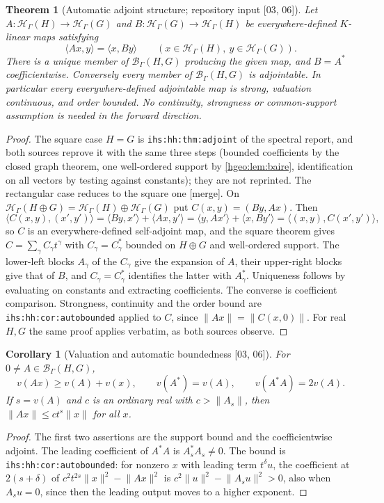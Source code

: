 \documentclass[11pt,letterpaper]{article}
\numberwithin{equation}{section}
\newtheorem{theorem}{Theorem}[section]
\newtheorem{corollary}[corollary]{Corollary}
\theoremstyle{definition}
\theoremstyle{remark}
\newcommand{\K}{K}
\newcommand{\HH}[1]{\mathscr H_\Gamma(#1)}
\newcommand{\BB}[2]{\mathscr B_\Gamma(#1,#2)}
\newcommand{\ip}[2]{\langle #1,#2\rangle}
\newcommand{\norm}[1]{\lVert #1\rVert}
\newcommand{\src}[1]{\textup{\textsf{\small[#1]}}}
\newcommand{\mergetag}{\textup{\textsf{\small[merge]}}}
\newcommand{\replabel}[1]{\nolinkurl{#1}}
\begin{document}
\begin{theorem}[Automatic adjoint structure; repository input
\src{03, 06}]\label{hgeo:thm:adjoint}
Let $A:\HH{H}\to\HH{G}$ and $B:\HH{G}\to\HH{H}$ be everywhere-defined
$\K$-linear maps satisfying
\[
 \ip{Ax}{y}=\ip{x}{By}\qquad(x\in\HH{H},\ y\in\HH{G}).
\]
There is a unique member of $\BB{H}{G}$ producing the given map, and
$B=A^*$ coefficientwise. Conversely every member of $\BB{H}{G}$ is
adjointable. In particular every everywhere-defined adjointable map is
strong, valuation continuous, and order bounded. No continuity, strongness
or common-support assumption is needed in the forward direction.
\end{theorem}
\begin{proof}
The square case $H=G$ is \replabel{ihs:hh:thm:adjoint} of the spectral
report, and both sources reprove it with the same three steps (bounded
coefficients by the closed graph theorem, one well-ordered support by
\cref{hgeo:lem:baire}, identification on all vectors by testing against
constants); they are not reprinted. The rectangular case reduces to the
square one \mergetag. On $\HH{H\oplus G}=\HH{H}\oplus\HH{G}$ put
$C(x,y)=(By,Ax)$. Then
\[
 \ip{C(x,y)}{(x',y')}=\ip{By}{x'}+\ip{Ax}{y'}
 =\ip{y}{Ax'}+\ip{x}{By'}=\ip{(x,y)}{C(x',y')},
\]
so $C$ is an everywhere-defined self-adjoint map, and the square theorem
gives $C=\sum_\gamma C_\gamma t^\gamma$ with $C_\gamma=C_\gamma^*$ bounded on
$H\oplus G$ and well-ordered support. The lower-left blocks $A_\gamma$ of the
$C_\gamma$ give the expansion of $A$, their upper-right blocks give that of
$B$, and $C_\gamma=C_\gamma^*$ identifies the latter with $A_\gamma^*$.
Uniqueness follows by evaluating on constants and extracting coefficients.
The converse is coefficient comparison. Strongness, continuity and the order
bound are \replabel{ihs:hh:cor:autobounded} applied to $C$, since
$\norm{Ax}=\norm{C(x,0)}$. For real $H,G$ the same proof applies verbatim, as
both sources observe.
\end{proof}

\begin{corollary}[Valuation and automatic boundedness
\src{03, 06}]\label{hgeo:cor:vop}
For $0\ne A\in\BB{H}{G}$,
\[
 v(Ax)\ge v(A)+v(x),\qquad
 v(A^*)=v(A),\qquad
 v(A^*A)=2v(A).
\]
If $s=v(A)$ and $c$ is an ordinary real with $c>\norm{A_s}$, then
$\norm{Ax}\le ct^s\norm{x}$ for all $x$.
\end{corollary}
\begin{proof}
The first two assertions are the support bound and the coefficientwise
adjoint. The leading coefficient of $A^*A$ is $A_s^*A_s\ne0$. The bound is
\replabel{ihs:hh:cor:autobounded}: for nonzero $x$ with leading term
$t^\delta u$, the coefficient at $2(s+\delta)$ of
$c^2t^{2s}\norm{x}^2-\norm{Ax}^2$ is $c^2\norm{u}^2-\norm{A_su}^2>0$, also
when $A_su=0$, since then the leading output moves to a higher exponent.
\end{proof}
\end{document}
